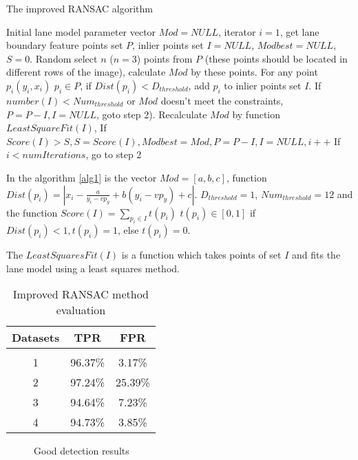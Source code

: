 \documentclass[conference]{IEEEtran}
\begin{document}
\begin{algorithm}
\caption{The improved RANSAC algorithm}
\label{alg1}
\begin{algorithmic}[1]
\State Initial lane model parameter vector $Mod=NULL$, iterator $i=1$, get lane boundary feature points set $P$, inlier points set $I=NULL$, $Modbest=NULL$, $S=0$. \linebreak
\State Random select $n$ ($n=3$) points from $P$ (these points should be located in different rows of the image), calculate $Mod$ by these points.
\State For any point $p_i(y_i,x_i)$ $p_i \in P $, if $Dist(p_i)<D_{threshold}$, add $p_i$ to inlier points set $I$.
\State If $number(I) < Num_{threshold}$ or $Mod$ doesn't meet the constraints, $P=P-I,I=NULL$, goto step 2).
\State Recalculate $Mod$ by function $LeastSquareFit(I)$, If $Score(I)>S, S=Score(I), Modbest=Mod, P=P-I, I=NULL, i++$
\State If $i < numIterations$, go to step 2
\end{algorithmic}

\end{algorithm} 

In the algorithm \ref{alg1} is the vector $Mod = [a,b,c]$, function $Dist(p_i) = |x_i - \frac{a}{y_i - vp_y} + b(y_i - vp_y)+ c|$. $D_{threshold} = 1$, $Num_{threshold} = 12$ and the function $Score(I) = \sum_{p_i \in I}t(p_i)$ 
$t(p_i) \in [0,1]$ if $Dist(p_i) < 1, t(p_i) = 1$, else $t(p_i)=0$.

The $LeastSquaresFit(I)$ is a function which takes points of set $I$ and fits the lane model using a least squares method.

\begin{table}[]
\centering
\caption{Improved RANSAC method evaluation}
\label{eval1}
\begin{tabular}{c c c}
\hline
Datasets & TPR & FPR \\
\hline 
\\
1 & 96.37\% & 3.17\% \\
2 & 97.24\% & 25.39\% \\
3 & 94.64\% & 7.23\% \\
4 & 94.73\% & 3.85\% \\
\end{tabular}
\end{table}


\begin{figure}[ht]
	\centering
	\caption{Good detection results}
	\label{fig5}
\end{figure}
\end{document}
